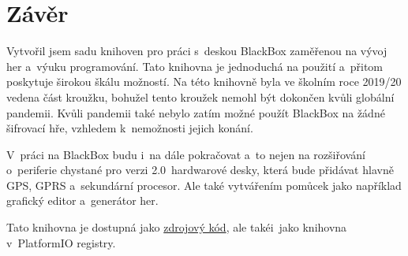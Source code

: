 \chapter{Závěr}

Vytvořil jsem sadu knihoven pro práci s~deskou BlackBox zaměřenou na vývoj her a~výuku programování.%
Tato knihovna je jednoduchá na použití a~přitom poskytuje širokou škálu možností.
Na této knihovně byla ve školním roce 2019/20 vedena část kroužku, bohužel tento kroužek nemohl být dokončen kvůli globální pandemii.
Kvůli pandemii také nebylo zatím možné použít BlackBox na žádné šifrovací hře, vzhledem k~nemožnosti jejich konání.

V~práci na BlackBox budu i~na dále pokračovat a~to nejen na rozšiřování o~periferie chystané pro verzi 2.0~hardwarové desky, která bude přidávat hlavně GPS, GPRS a~sekundární procesor.
Ale také vytvářením pomůcek jako například grafický editor a~generátor her.

Tato knihovna je dostupná jako \href{https://github.com/RoboticsBrno/BlackBox_library}{zdrojový kód}, ale takéi~jako knihovna v~PlatformIO registry\cite{pio-registry}.